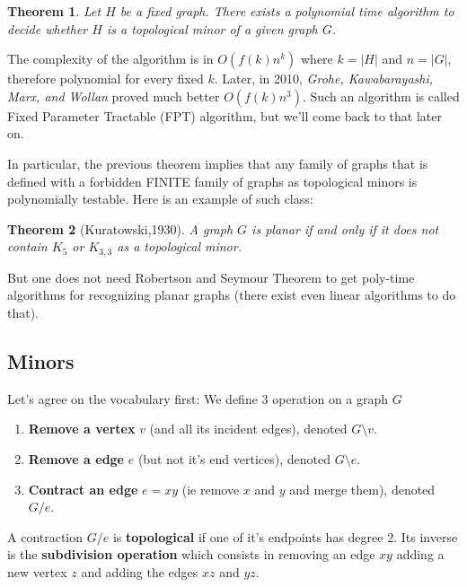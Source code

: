 \documentclass[12pt,a4paper]{article}
\newtheorem{theorem}{Theorem}
\begin{document}
\begin{theorem}
  Let $H$ be a fixed graph.  There exists a polynomial time algorithm to decide
  whether $H$ is a topological minor of a given graph $G$.
\end{theorem}

The complexity of the algorithm is in $O(f(k)n^k)$ where $k=|H|$ and $n=|G|$,
therefore polynomial for every fixed $k$. Later, in 2010, \textit{Grohe,
  Kawabarayashi, Marx, and Wollan} proved much better $O(f(k)n^3)$.  Such an
algorithm is called Fixed Parameter Tractable (FPT) algorithm, but we'll come
back to that later on.

In particular, the previous theorem implies that any family of graphs that is
defined with a forbidden FINITE family of graphs as topological minors is
polynomially testable.  Here is an example of such class:

\begin{theorem}[Kuratowski,1930]
  A graph $G$ is planar if and only if it does not contain $K_5$ or $K_{3,3}$ as
  a topological minor.
\end{theorem}

But one does not need Robertson and Seymour Theorem to get poly-time algorithms
for recognizing planar graphs (there exist even linear algorithms to do that).

\subsection{Minors}

Let's agree on the vocabulary first: We define 3 operation on a graph $G$
\begin{enumerate}

\item \textbf{Remove a vertex} $v$ (and all its incident edges), denoted
  $G \setminus v$.
\item \textbf{Remove a edge} $e$ (but not it's end vertices), denoted
  $G \setminus e$.
\item \textbf{Contract an edge} $e=xy$ (ie remove $x$ and $y$ and merge them),
  denoted $G/e$.
\end{enumerate}
A contraction $G/e$ is \textbf{topological} if one of it's endpoints has degree
2. Its inverse is the \textbf{subdivision operation} which consists in removing
an edge $xy$ adding a new vertex $z$ and adding the edges $xz$ and $yz$.
\end{document}
